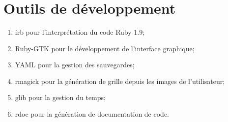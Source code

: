 \section{Outils de développement}
\paragraph*{}
\begin{enumerate}
\item irb pour l'interprétation du code Ruby 1.9;
\item Ruby-GTK pour le développement de l'interface graphique;
\item YAML pour la gestion des sauvegardes; %
\item rmagick pour la génération de grille depuis les images de l'utilisateur;
\item glib pour la gestion du temps;
\item rdoc pour la génération de documentation de code.
\end{enumerate}






